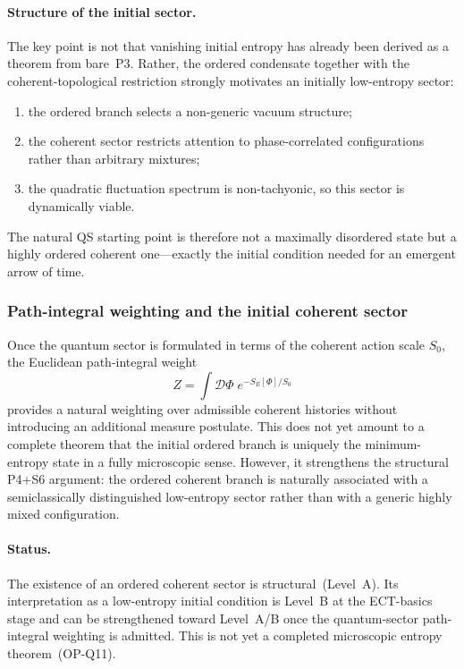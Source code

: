 \documentclass[11pt,a4paper]{article}
\numberwithin{equation}{section}
\begin{document}
\paragraph{Structure of the initial sector.}
The key point is not that vanishing initial entropy has already been
derived as a theorem from bare~P3.
Rather, the ordered condensate together with the coherent-topological
restriction strongly motivates an initially low-entropy sector:
\begin{enumerate}[label=(\roman*)]
  \item the ordered branch selects a non-generic vacuum structure;
  \item the coherent sector restricts attention to phase-correlated
    configurations rather than arbitrary mixtures;
  \item the quadratic fluctuation spectrum is non-tachyonic, so this
    sector is dynamically viable.
\end{enumerate}
The natural QS starting point is therefore not a maximally disordered
state but a highly ordered coherent one---exactly the initial condition
needed for an emergent arrow of time.

\subsubsection*{Path-integral weighting and the initial coherent sector}

Once the quantum sector is formulated in terms of the coherent
action scale $S_0$, the Euclidean path-integral weight
\begin{equation}
  \label{eq:qs_partition_function}
  Z = \int \mathcal{D}\Phi\; e^{-S_E[\Phi]/S_0}
\end{equation}
provides a natural weighting over admissible coherent histories
without introducing an additional measure postulate.
This does not yet amount to a complete theorem that the initial
ordered branch is uniquely the minimum-entropy state in a fully
microscopic sense.
However, it strengthens the structural P4+S6 argument:
the ordered coherent branch is naturally associated with a
semiclassically distinguished low-entropy sector rather than with a
generic highly mixed configuration.

\paragraph{Status.}
The existence of an ordered coherent sector is structural~(Level~A).
Its interpretation as a low-entropy initial condition is Level~B at
the ECT-basics stage and can be strengthened toward Level~A/B once
the quantum-sector path-integral weighting is admitted.
This is not yet a completed microscopic entropy theorem~(OP-Q11).
\end{document}
